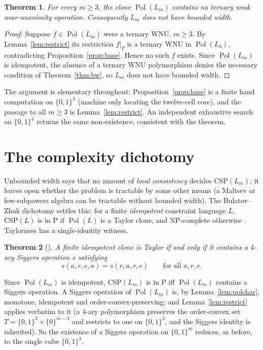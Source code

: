 \documentclass[11pt]{amsart}
\theoremstyle{plain}
\newtheorem{thm}{Theorem}[section]
\theoremstyle{definition}
\DeclareMathOperator{\Pol}{Pol}
\newcommand{\B}{\{0,1\}}
\begin{document}
\begin{thm}\label{thm:main}
  For every $m\ge 3$, the clone $\Pol(L_m)$ contains no ternary weak
  near-unanimity operation.  Consequently $L_m$ does not have bounded
  width.
\end{thm}

\begin{proof}
  Suppose $f\in\Pol(L_m)$ were a ternary WNU, $m\ge3$.  By
  Lemma~\ref{lem:restrict} its restriction $f|_T$ is a ternary WNU in
  $\Pol(L_3)$, contradicting Proposition~\ref{prop:base}.  Hence no
  such $f$ exists.  Since $\Pol(L_m)$ is idempotent, the absence of a
  ternary WNU polymorphism denies the necessary condition of
  Theorem~\ref{thm:bw}, so $L_m$ does not have bounded width.
\end{proof}

The argument is elementary throughout: Proposition~\ref{prop:base} is a
finite hand computation on $\B^3$ (machine only locating the twelve-cell
core), and the passage to all $m\ge3$ is Lemma~\ref{lem:restrict}.  An
independent exhaustive search on $\B^4$ returns the same non-existence,
consistent with the theorem.

\section{The complexity dichotomy}

Unbounded width says that no amount of \emph{local consistency} decides
$\mathrm{CSP}(L_m)$; it leaves open whether the problem is tractable by
some other means (a Maltsev or few-subpowers algebra can be tractable
without bounded width).  The Bulatov--Zhuk dichotomy settles this: for a
finite \emph{idempotent} constraint language $L$, $\mathrm{CSP}(L)$ is in
$\mathrm P$ if $\Pol(L)$ is a Taylor clone, and $\mathrm{NP}$-complete
otherwise \cite{Bulatov,Zhuk}.  Taylorness has a single-identity witness.

\begin{thm}[\cite{Siggers,KMM}]\label{thm:siggers}
  A finite idempotent clone is Taylor if and only if it contains a
  $4$-ary \emph{Siggers} operation $s$ satisfying
  \[
    s(a,r,e,a) = s(r,a,r,e)\qquad\text{for all }a,r,e .
  \]
\end{thm}

Since $\Pol(L_m)$ is idempotent, $\mathrm{CSP}(L_m)$ is in $\mathrm P$ iff
$\Pol(L_m)$ contains a Siggers operation.  A Siggers operation of
$\Pol(L_m)$ is, by Lemma~\ref{lem:polchar}, monotone, idempotent and
order-convex-preserving; and Lemma~\ref{lem:restrict} applies verbatim to
it (a $4$-ary polymorphism preserves the order-convex set $T=\B^3\times
\{0\}^{m-3}$ and restricts to one on $\B^3$, and the Siggers identity is
inherited).  So the existence of a Siggers operation on $\B^m$ reduces,
as before, to the single cube $\B^3$.
\end{document}
